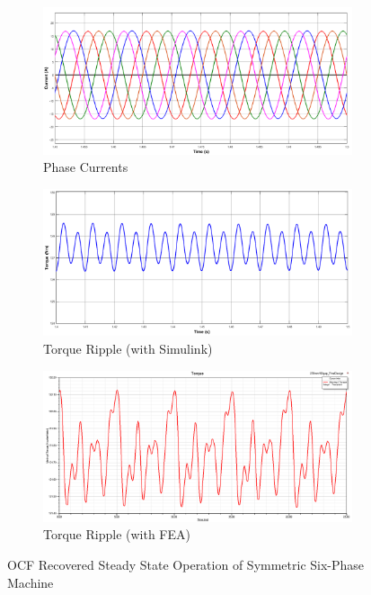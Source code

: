 \documentclass[a4paper,11pt]{article}
\begin{document}
\begin{figure}[ht!]
\begin{subfigure}[b]{0.33\textwidth}
    \centering
    \includegraphics[width=\linewidth]{ss_recover_current.png}
    \caption{Phase Currents}
    \label{fig:ocfcurrent}    
\end{subfigure}
\begin{subfigure}[b]{0.33\textwidth}
    \centering
    \includegraphics[width=\linewidth]{ss_recover_torque.png}
    \caption{Torque Ripple (with Simulink)}
    \label{fig:ocftorque}    
\end{subfigure}
\begin{subfigure}[b]{0.33\textwidth}
    \centering
    \includegraphics[width=\linewidth]{ss_recover_torque_fea.png}
    \caption{Torque Ripple (with FEA)}
    \label{fig:ocftorquefea}   
\end{subfigure}
 \caption{OCF Recovered Steady State Operation of Symmetric Six-Phase Machine}
 \label{fig:ocfresponse}
\end{figure}
\end{document}
